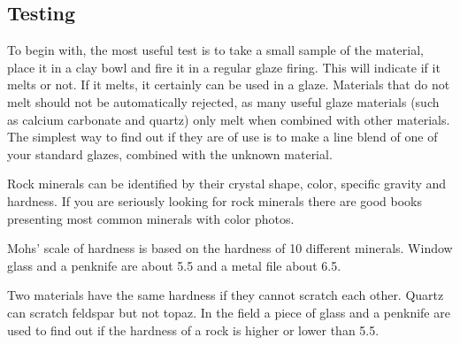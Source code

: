 \subsection{Testing}
To begin with, the most useful test is to take a small sample of the material, 
place it in a clay bowl and fire it in a regular glaze firing. This will 
indicate if it melts or not. If it melts, it certainly can be used in a glaze. 
Materials that do not melt should not be automatically rejected, as many useful 
glaze materials (such as calcium carbonate and quartz) only melt when combined 
with other materials. The simplest way to find out if they are of use is to 
make a line blend of one of your standard glazes, combined with the unknown 
material.

Rock minerals can be identified by their crystal shape, color, specific gravity 
and hardness. If you are seriously looking for rock minerals there are good 
books presenting most common minerals with color photos.

Mohs' scale of hardness is based on the hardness of 10 different minerals. 
Window glass and a penknife are about 5.5 and a metal file about 6.5.

Two materials have the same hardness if they cannot scratch each other. Quartz 
can scratch feldspar but not topaz. In the field a piece of glass and a 
penknife are used to find out if the hardness of a rock is higher or lower than 
5.5.

